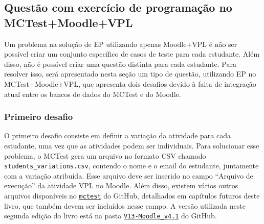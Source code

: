 \subsection{Questão com exercício de programação no MCTest+Moodle+VPL}\label{sec:questao_VPL}

Um problema na solução de EP utilizando apenas Moodle+VPL é não ser possível criar um conjunto específico de casos de teste para cada estudante. Além disso, não é possível criar uma questão distinta para cada estudante. Para resolver isso, será apresentado nesta seção um tipo de questão, utilizando EP no MCTest+Moodle+VPL, que apresenta dois desafios devido à falta de integração atual entre os bancos de dados do MCTest e do Moodle.


\subsubsection{Primeiro desafio}

O primeiro desafio consiste em definir a variação da atividade para cada estudante, uma vez que as atividades podem ser individuais. Para solucionar esse problema, o MCTest gera um arquivo no formato CSV chamado \verb|students_variations.csv|, contendo o nome e o email do estudante, juntamente com a variação atribuída. Esse arquivo deve ser inserido no campo ``Arquivo de execução'' da atividade VPL no Moodle. Além disso, existem vários outros arquivos disponíveis no \href{https://github.com/fzampirolli/mctest}{\texttt{mctest}} do GitHub, detalhados em capítulos futuros deste livro, que também devem ser incluídos nesse campo. A versão utilizada neste segunda edição do livro está na pasta \href{https://github.com/fzampirolli/mctest/tree/master/VPL_modification/V13-Moodle_v4.1}{\texttt{V13-Moodle\_v4.1}} do GitHub.



